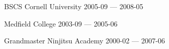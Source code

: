 


\begin{cventries}

  \cventry
    {BSCS} %
    {Cornell University} %
    {} %
    {2005-09 — 2008-05} %
    {}


  \cventry
    {} %
    {Medfield College} %
    {} %
    {2003-09 — 2005-06} %
    {}


  \cventry
    {Grandmaster} %
    {Ninjitsu Academy} %
    {} %
    {2000-02 — 2007-06} %
    {}


\end{cventries}

